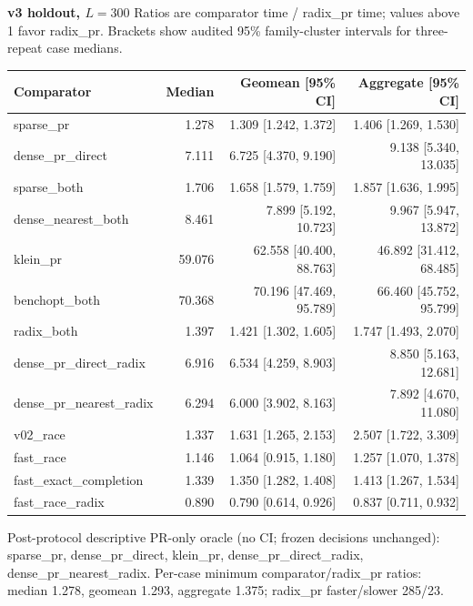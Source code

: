 \par\noindent\textbf{v3 holdout, $L=300$}
Ratios are comparator time / radix\_pr time; values above 1 favor radix\_pr.
Brackets show audited 95\% family-cluster intervals for three-repeat case medians.
\par\smallskip
\begin{tabular}{lrrr}
Comparator & Median & Geomean [95\% CI] & Aggregate [95\% CI] \\
\hline
sparse\_pr & 1.278 & 1.309 [1.242, 1.372] & 1.406 [1.269, 1.530] \\
dense\_pr\_direct & 7.111 & 6.725 [4.370, 9.190] & 9.138 [5.340, 13.035] \\
sparse\_both & 1.706 & 1.658 [1.579, 1.759] & 1.857 [1.636, 1.995] \\
dense\_nearest\_both & 8.461 & 7.899 [5.192, 10.723] & 9.967 [5.947, 13.872] \\
klein\_pr & 59.076 & 62.558 [40.400, 88.763] & 46.892 [31.412, 68.485] \\
benchopt\_both & 70.368 & 70.196 [47.469, 95.789] & 66.460 [45.752, 95.799] \\
radix\_both & 1.397 & 1.421 [1.302, 1.605] & 1.747 [1.493, 2.070] \\
dense\_pr\_direct\_radix & 6.916 & 6.534 [4.259, 8.903] & 8.850 [5.163, 12.681] \\
dense\_pr\_nearest\_radix & 6.294 & 6.000 [3.902, 8.163] & 7.892 [4.670, 11.080] \\
v02\_race & 1.337 & 1.631 [1.265, 2.153] & 2.507 [1.722, 3.309] \\
fast\_race & 1.146 & 1.064 [0.915, 1.180] & 1.257 [1.070, 1.378] \\
fast\_exact\_completion & 1.339 & 1.350 [1.282, 1.408] & 1.413 [1.267, 1.534] \\
fast\_race\_radix & 0.890 & 0.790 [0.614, 0.926] & 0.837 [0.711, 0.932] \\
\end{tabular}
\par\smallskip
Post-protocol descriptive PR-only oracle (no CI; frozen decisions unchanged): sparse\_pr, dense\_pr\_direct, klein\_pr, dense\_pr\_direct\_radix, dense\_pr\_nearest\_radix.
Per-case minimum comparator/radix\_pr ratios: median 1.278, geomean 1.293, aggregate 1.375; radix\_pr faster/slower 285/23.
